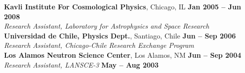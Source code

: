 \documentclass[margin,line]{resume}
\begin{document}
\begin{resume}
    \textbf{Kavli Institute For Cosmological Physics}, Chicago, IL \hfill \textbf{Jan 2005 -- Jun 2008}\\
                \textsl{Research Assistant, Laboratory for Astrophysics and 
                Space Research}\vspace{2mm}\\
    \textbf{Universidad de Chile, Physics Dept.}, Santiago, Chile \hfill \textbf{Jun -- Sep 2006}\\
                \textsl{Research Assistant, Chicago-Chile Research Exchange 
                Program}\vspace{2mm}\\
    \textbf{Los Alamos Neutron Science Center}, Los Alamos, NM \hfill \textbf{Jun -- Sep 2004}\\
                \textsl{Research Assistant, LANSCE-3} \hfill \textbf{May -- Aug 
                2003}

\end{resume}
\end{document}
